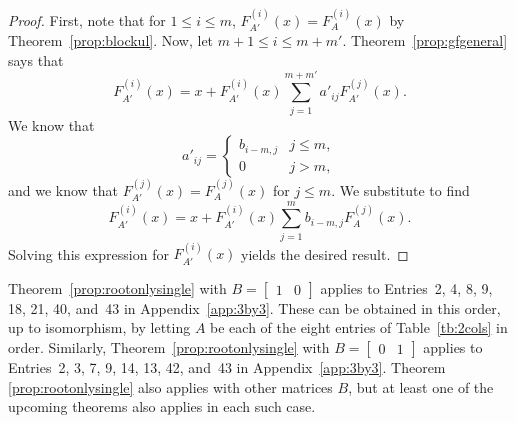 \documentclass[12pt]{amsart}
\newcommand{\gff}[2]{F_{#2}^{(#1)}(x)}
\begin{document}
\begin{proof}
    First, note that 
    for $1\leq i\leq m$, $\gff{i}{A'}=\gff{i}{A}$ by Theorem~\ref{prop:blockul}.
    Now, let $m+1\leq i\leq m+m'$. Theorem~\ref{prop:gfgeneral} says that
    \[
    \gff{i}{A'}=x+\gff{i}{A'}\sum_{j=1}^{m+m'}a'_{ij}\gff{j}{A'}.
    \]
    We know that
    \[
    a'_{ij}=\begin{cases}
        b_{i-m,j}&j\leq m,\\
        0&j>m,
    \end{cases}
    \]
    and we know that $\gff{j}{A'}=\gff{j}{A}$ for $j\leq m$. 
    We substitute to find
    \[
    \gff{i}{A'}=x+\gff{i}{A'}\sum_{j=1}^{m}b_{i-m,j}\gff{j}{A}.
    \]
    Solving this expression for $\gff{i}{A'}$ yields the desired result.
\end{proof}
Theorem~\ref{prop:rootonlysingle} with $B=\begin{bmatrix}1&0\end{bmatrix}$ applies to Entries~2, 4, 8, 9, 18, 21, 40, and~43 in Appendix~\ref{app:3by3}. These can be obtained in this order, up to isomorphism, by letting $A$ be each of the eight entries of Table~\ref{tb:2cols} in order. Similarly, Theorem~\ref{prop:rootonlysingle} with $B=\begin{bmatrix}0&1\end{bmatrix}$ applies to Entries~2, 3, 7, 9, 14, 13, 42, and~43 in Appendix~\ref{app:3by3}. 
Theorem \ref{prop:rootonlysingle}
also applies with other matrices $B$, but at least one of the upcoming theorems also applies in each such case.
\end{document}
